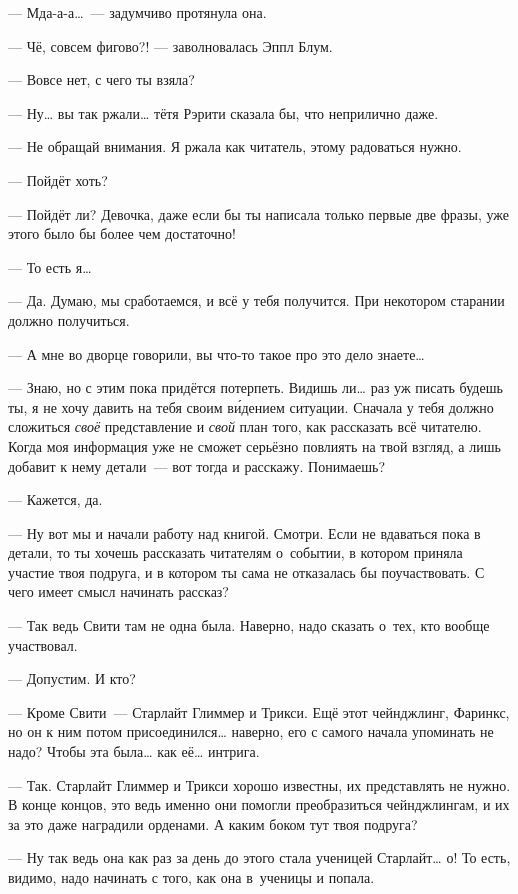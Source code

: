 \documentclass[fontsize=11pt,a5paper,titlepage=firstcover]{scrbook}
\begin{document}
--- Мда-а-а{\ldots}~--- задумчиво протянула она.

--- Чё, совсем фигово?! --- заволновалась Эппл Блум.

--- Вовсе нет, с чего ты взяла?

--- Ну{\ldots} вы так ржали{\ldots} тётя Рэрити сказала бы, что неприлично даже.

--- Не обращай внимания. Я ржала как читатель, этому радоваться нужно.

--- Пойдёт хоть?

--- Пойдёт ли? Девочка, даже если бы ты написала только первые две фразы, уже этого было бы более чем достаточно!

--- То есть я{\ldots}

--- Да. Думаю, мы сработаемся, и всё у тебя получится. При некотором старании должно получиться.

--- А мне во дворце говорили, вы что-то такое про это дело знаете{\ldots}

--- Знаю, но с этим пока придётся потерпеть. Видишь ли{\ldots} раз уж писать будешь ты, я не хочу давить на тебя своим ви́дением ситуации. Сначала у тебя должно сложиться \emph{своё} представление и \emph{свой} план того, как рассказать всё читателю. Когда моя информация уже не сможет серьёзно повлиять на твой взгляд, а лишь добавит к нему детали~--- вот тогда и расскажу. Понимаешь?

--- Кажется, да.

--- Ну вот мы и начали работу над книгой. Смотри. Если не вдаваться пока в детали, то ты хочешь рассказать читателям о~событии, в котором приняла участие твоя подруга, и в котором ты сама не отказалась бы поучаствовать. С чего имеет смысл начинать рассказ?

--- Так ведь Свити там не одна была. Наверно, надо сказать о~тех, кто вообще участвовал.

--- Допустим. И кто?

--- Кроме Свити~--- Старлайт Глиммер и Трикси. Ещё этот чейнджлинг, Фаринкс, но он к ним потом присоединился{\ldots} наверно, его с самого начала упоминать не надо? Чтобы эта была{\ldots} как её{\ldots} интрига.

--- Так. Старлайт Глиммер и Трикси хорошо известны, их представлять не нужно. В конце концов, это ведь именно они помогли преобразиться чейнджлингам, и их за это даже наградили орденами. А каким боком тут твоя подруга?

--- Ну так ведь она как раз за день до этого стала ученицей Старлайт{\ldots} о! То есть, видимо, надо начинать с того, как она в~ученицы и попала.
\end{document}
